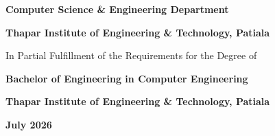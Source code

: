 \documentclass[12pt, a4paper, oneside]{report}
\begin{document}
\begin{titlepage}
\begin{center}
{\fontsize{14}{18}\selectfont\bfseries
Computer Science \& Engineering Department
}

{\fontsize{14}{16}\selectfont\bfseries
Thapar Institute of Engineering \& Technology, Patiala
}

\vspace{0.5cm}

{\fontsize{13}{15}\selectfont
In Partial Fulfillment of the Requirements for the Degree of
}

\vspace{0.2cm}

{\fontsize{13}{15}\selectfont\bfseries
Bachelor of Engineering in Computer Engineering
}

{\fontsize{13}{15}\selectfont\bfseries
Thapar Institute of Engineering \& Technology, Patiala
}

\vspace{0.3cm}

{\fontsize{13}{15}\selectfont\bfseries July 2026}

\end{center}
\end{titlepage}

\clearpage
{}
\setcounter{page}{1}

\thispagestyle{plain}


\vspace{0.15in}


\vspace{0.1in}


\vspace{0.15in}


\vspace{0.15in}


\vspace{0.15in}
\end{document}
